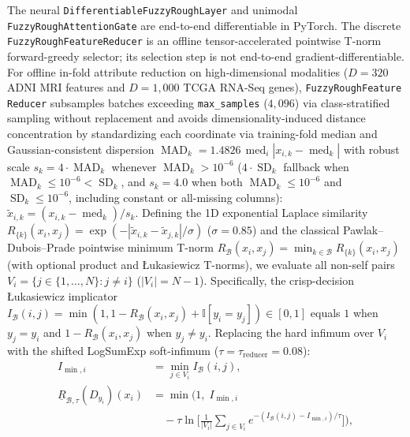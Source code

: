 \documentclass[10pt,twocolumn]{article}
\begin{document}
The neural \texttt{DifferentiableFuzzyRoughLayer} and unimodal
\texttt{FuzzyRoughAttentionGate} are end-to-end differentiable in PyTorch. The discrete
\texttt{FuzzyRoughFeatureReducer} is an offline tensor-accelerated pointwise T-norm
forward-greedy selector; its selection step is not end-to-end gradient-differentiable.
For offline in-fold attribute reduction on high-dimensional modalities ($D=320$ ADNI MRI
features and $D=1,000$ TCGA RNA-Seq genes), \texttt{FuzzyRough\allowbreak Feature\allowbreak
Reducer} subsamples batches exceeding \texttt{max\_\allowbreak samples} ($4,096$) via
class-stratified sampling without replacement and avoids dimensionality-induced distance
concentration by standardizing each coordinate via training-fold median and Gaussian-consistent
dispersion $\operatorname{MAD}_k = 1.4826\,\operatorname{med}_i|x_{i,k}-\operatorname{med}_k|$
with robust scale $s_k = 4\cdot\operatorname{MAD}_k$ whenever $\operatorname{MAD}_k >
10^{-6}$ ($4\cdot\operatorname{SD}_k$ fallback when $\operatorname{MAD}_k \le 10^{-6} <
\operatorname{SD}_k$, and $s_k = 4.0$ when both $\operatorname{MAD}_k \le 10^{-6}$ and
$\operatorname{SD}_k \le 10^{-6}$, including constant or all-missing columns):
$\tilde{x}_{i,k} = (x_{i,k} - \operatorname{med}_k)/s_k$. Defining the 1D exponential Laplace
similarity $R_{\{k\}}(x_i,x_j) = \exp(-|\tilde{x}_{i,k}-\tilde{x}_{j,k}|/\sigma)$
($\sigma=0.85$) and the classical Pawlak--Dubois--Prade pointwise minimum T-norm
$R_{\mathcal{B}}(x_i,x_j) = \min_{k\in\mathcal{B}} R_{\{k\}}(x_i,x_j)$ (with optional product
and {\L}ukasiewicz T-norms), we evaluate all non-self pairs $V_i = \{j \in \{1,\dots,N\} : j
\neq i\}$ ($|V_i|=N-1$). Specifically, the crisp-decision {\L}ukasiewicz implicator
$I_{\mathcal{B}}(i,j) = \min(1, 1 - R_{\mathcal{B}}(x_i,x_j) + \mathbb{I}[y_i = y_j]) \in
[0,1]$ equals $1$ when $y_j = y_i$ and $1 - R_{\mathcal{B}}(x_i,x_j)$ when $y_j \neq y_i$.
Replacing the hard infimum over $V_i$ with the shifted LogSumExp soft-infimum ($\tau =
\tau_{\text{reducer}} = 0.08$):
\begin{equation}
\label{eq:reducer_softmin}
\begin{aligned}
I_{\min,i} &= \min_{j\in V_i} I_{\mathcal{B}}(i,j), \\
\underline{R}_{\mathcal{B},\tau}(D_{y_i})(x_i) &= \min\!\Big(1,\; I_{\min,i} \\
&\quad - \tau\ln\!\Big[\frac{1}{|V_i|}\sum_{j\in V_i} e^{-(I_{\mathcal{B}}(i,j) -
I_{\min,i})/\tau}\Big]\Big),
\end{aligned}
\end{equation}
\end{document}
